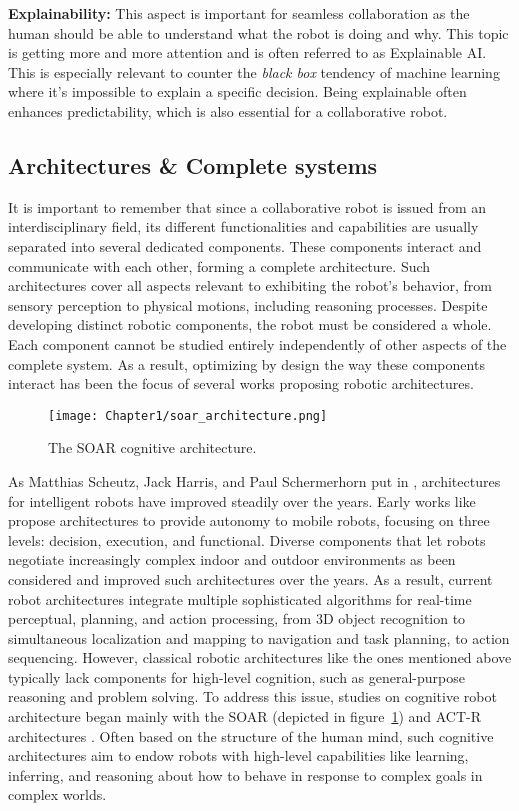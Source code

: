 \textbf{Explainability:} This aspect is important for seamless collaboration as the human should be able to understand what the robot is doing and why. This topic is getting more and more attention and is often referred to as Explainable AI. This is especially relevant to counter the \textit{black box} tendency of machine learning where it's impossible to explain a specific decision. Being explainable often enhances predictability, which is also essential for a collaborative robot.

\subsection{Architectures \& Complete systems}

It is important to remember that since a collaborative robot is issued from an interdisciplinary field, its different functionalities and capabilities are usually separated into several dedicated components. These components interact and communicate with each other, forming a complete architecture. Such architectures cover all aspects relevant to exhibiting the robot's behavior, from sensory perception to physical motions, including reasoning processes. 
Despite developing distinct robotic components, the robot must be considered a whole. Each component cannot be studied entirely independently of other aspects of the complete system. As a result, optimizing by design the way these components interact has been the focus of several works proposing robotic architectures.

\begin{figure}
    \center
    \texttt{[image: Chapter1/soar\_architecture.png]}
    \caption{The SOAR cognitive architecture.}
    \label{fig:soar}
\end{figure}

As Matthias Scheutz, Jack Harris, and Paul Schermerhorn put in \cite{scheutz_systematic_2013}, architectures for intelligent robots have improved steadily over the years. 
Early works like \cite{alami_designing_1993,alami_architecture_1998,chatila_integrated_1992} propose architectures to provide autonomy to mobile robots, focusing on three levels: decision, execution, and functional. Diverse components that let robots negotiate increasingly complex indoor and outdoor environments as been considered and improved such architectures over the years. As a result, current robot architectures integrate multiple sophisticated algorithms for real-time perceptual, planning, and action processing, from 3D object recognition to simultaneous localization and mapping to navigation and task planning, to action sequencing. However, classical robotic architectures like the ones mentioned above typically lack components for high-level cognition, such as general-purpose reasoning and problem solving. 
To address this issue, studies on cognitive robot architecture began mainly with the SOAR (depicted in figure~\ref{fig:soar}) and ACT-R architectures \cite{laird_soar_1987,anderson2004integrated}.
Often based on the structure of the human mind, such cognitive architectures aim to endow robots with high-level capabilities like learning, inferring, and reasoning about how to behave in response to complex goals in complex worlds. 


